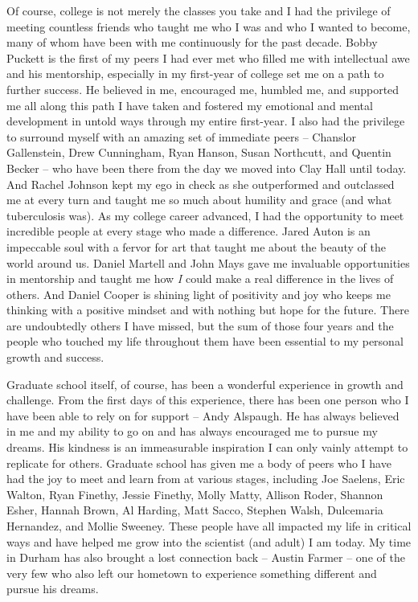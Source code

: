\documentclass[PhD]{dukethesis2006}
\begin{document}
\begin{doublespace}
Of course, college is not merely the classes you take and I had the privilege of meeting countless friends who taught me who I was and who I wanted to become, many of whom have been with me continuously for the past decade. Bobby Puckett is the first of my peers I had ever met who filled me with intellectual awe and his mentorship, especially in my first-year of college set me on a path to further success. He believed in me, encouraged me, humbled me, and supported me all along this path I have taken and fostered my emotional and mental development in untold ways through my entire first-year. I also had the privilege to surround myself with an amazing set of immediate peers -- Chanslor Gallenstein, Drew Cunningham, Ryan Hanson, Susan Northcutt, and Quentin Becker -- who have been there from the day we moved into Clay Hall until today. And Rachel Johnson kept my ego in check as she outperformed and outclassed me at every turn and taught me so much about humility and grace (and what tuberculosis was). As my college career advanced, I had the opportunity to meet incredible people at every stage who made a difference. Jared Auton is an impeccable soul with a fervor for art that taught me about the beauty of the world around us. Daniel Martell and John Mays gave me invaluable opportunities in mentorship and taught me how \textit{I} could make a real difference in the lives of others. And Daniel Cooper is shining light of positivity and joy who keeps me thinking with a positive mindset and with nothing but hope for the future. There are undoubtedly others I have missed, but the sum of those four years and the people who touched my life throughout them have been essential to my personal growth and success.

Graduate school itself, of course, has been a wonderful experience in growth and challenge. From the first days of this experience, there has been one person who I have been able to rely on for support -- Andy Alspaugh. He has always believed in me and my ability to go on and has always encouraged me to pursue my dreams. His kindness is an immeasurable inspiration I can only vainly attempt to replicate for others. Graduate school has given me a body of peers who I have had the joy to meet and learn from at various stages, including Joe Saelens, Eric Walton, Ryan Finethy, Jessie Finethy, Molly Matty, Allison Roder, Shannon Esher, Hannah Brown, Al Harding, Matt Sacco, Stephen Walsh, Dulcemaria Hernandez, and Mollie Sweeney. These people have all impacted my life in critical ways and have helped me grow into the scientist (and adult) I am today. My time in Durham has also brought a lost connection back -- Austin Farmer -- one of the very few who also left our hometown to experience something different and pursue his dreams. 


\end{doublespace}
\end{document}
